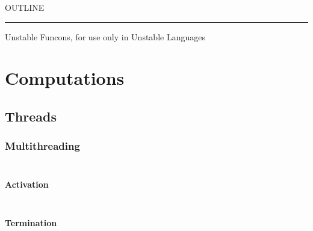 


    OUTLINE
  \tableofcontents
\begin{center}
\rule{3in}{0.4pt}
\end{center}

Unstable Funcons, for use only in Unstable Languages

\section{Computations}\hypertarget{computations}{}\label{computations}

\subsection{Threads}\hypertarget{threads}{}\label{threads}

\subsubsection{Multithreading}\hypertarget{multithreading}{}\label{multithreading}

\begin{align*}
  [ \
  \KEY{Datatype} \quad & \NAMEHYPER{../../../../../Unstable-Funcons-beta/Computations/Threads}{Multithreading}{thread-ids} \\
  \KEY{Funcon} \quad & \NAMEHYPER{../../../../../Unstable-Funcons-beta/Computations/Threads}{Multithreading}{thread-joinable}
  \ ]
\end{align*}
\paragraph{Activation}\hypertarget{activation}{}\label{activation}

\begin{align*}
  [ \
  \KEY{Funcon} \quad & \NAMEHYPER{../../../../../Unstable-Funcons-beta/Computations/Threads}{Multithreading}{multithread} \\
  \KEY{Funcon} \quad & \NAMEHYPER{../../../../../Unstable-Funcons-beta/Computations/Threads}{Multithreading}{thread-activate}
  \ ]
\end{align*}
\paragraph{Termination}\hypertarget{termination}{}\label{termination}

\begin{align*}
  [ \
  \KEY{Funcon} \quad & \NAMEHYPER{../../../../../Unstable-Funcons-beta/Computations/Threads}{Multithreading}{thread-join}
  \ ]
\end{align*}


